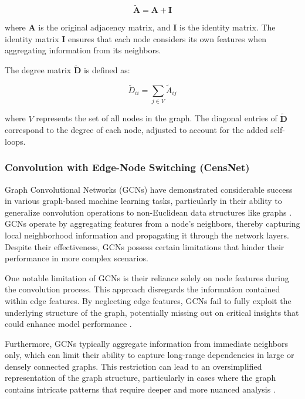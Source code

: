 \begin{equation}
 \tilde{\mathbf{A}} = \mathbf{A} + \mathbf{I}   
    \label{eq:modified_adjacency_matrix}
\end{equation}

where \( \mathbf{A} \) is the original adjacency matrix, and \( \mathbf{I} \) is the identity matrix. The identity matrix \( \mathbf{I} \) ensures that each node considers its own features when aggregating information from its neighbors.

The degree matrix \( \tilde{\mathbf{D}} \) is defined as:

\begin{equation}
 \tilde{D}_{ii} = \sum_{j \in V} \tilde{A}_{ij}   
    \label{eq:degree_matrix}
\end{equation}

where \( V \) represents the set of all nodes in the graph. The diagonal entries of \( \tilde{\mathbf{D}} \) correspond to the degree of each node, adjusted to account for the added self-loops.

\subsubsection{Convolution with Edge-Node Switching (CensNet)}

Graph Convolutional Networks (GCNs) have demonstrated considerable success in various graph-based machine learning tasks, particularly in their ability to generalize convolution operations to non-Euclidean data structures like graphs \cite{Fu_Wang_Liu_Liu_Zhou_You_Peng_Jing_2022} . GCNs operate by aggregating features from a node's neighbors, thereby capturing local neighborhood information and propagating it through the network layers. Despite their effectiveness, GCNs possess certain limitations that hinder their performance in more complex scenarios.

One notable limitation of GCNs is their reliance solely on node features during the convolution process. This approach disregards the information contained within edge features. By neglecting edge features, GCNs fail to fully exploit the underlying structure of the graph, potentially missing out on critical insights that could enhance model performance \cite{8954414}.

Furthermore, GCNs typically aggregate information from immediate neighbors only, which can limit their ability to capture long-range dependencies in large or densely connected graphs. This restriction can lead to an oversimplified representation of the graph structure, particularly in cases where the graph contains intricate patterns that require deeper and more nuanced analysis \cite{Guo_Zhang_Teng_Lu_2019}.


